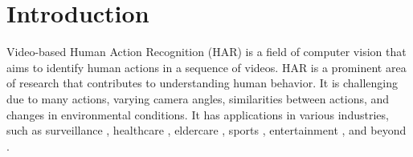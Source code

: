 \documentclass[mathematics,article,submit,pdftex,moreauthors]{Definitions/mdpi}
\begin{document}



\section{Introduction}

Video-based Human Action Recognition (HAR) is a field of computer vision that aims to identify human actions in a sequence of videos. HAR is a prominent area of research \cite{Luo2023-xq} that contributes to understanding human behavior. It is challenging due to many actions, varying camera angles, similarities between actions, and changes in environmental conditions. It has applications in various industries, such as surveillance \cite{9506554}, healthcare \cite{GONCALVES2023120288}, eldercare \cite{9324837}, sports \cite{Luo2023-xq,niu2021}, entertainment \cite{highfive}, and beyond \cite{YU2024126827}.
\end{document}
